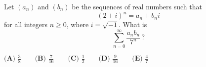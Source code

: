 Let $(a_n)$ and $(b_n)$ be the sequences of real numbers such that 
\[
(2 + i)^n = a_n + b_ni
\]
for all integers $n\geq 0$, where $i = \sqrt{-1}$.  What is \[\sum_{n=0}^\infty\frac{a_nb_n}{7^n}\,?\]

$\textbf{(A) }\frac 38\qquad\textbf{(B) }\frac7{16}\qquad\textbf{(C) }\frac12\qquad\textbf{(D) }\frac9{16}\qquad\textbf{(E) }\frac47$